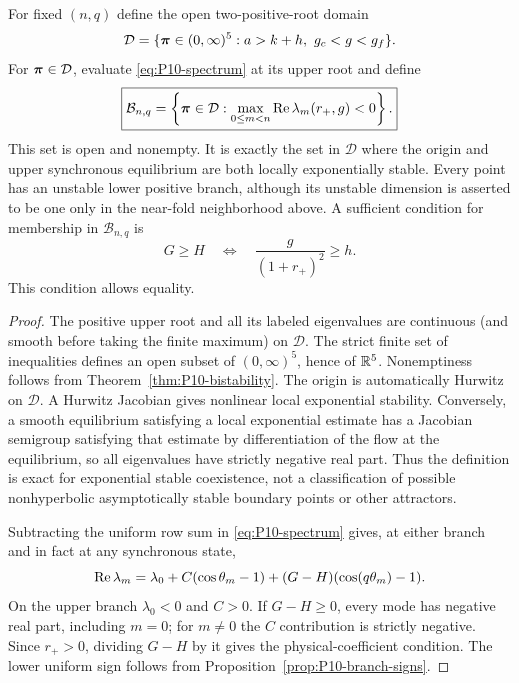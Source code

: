 \begin{proposition}
\label{prop:P10-bistability-set}
For fixed $(n,q)$ define the open two-positive-root domain
\[
 \mathcal D=\{\param\in(0,\infty)^5:a>k+h,\ g_c<g<g_f\}.
\]
For $\boldsymbol{\pi}\in\mathcal D$, evaluate \eqref{eq:P10-spectrum} at its
upper root and define
\begin{equation}
 \boxed{\mathcal B_{n,q}=
 \left\{\boldsymbol{\pi}\in\mathcal D:
 \max_{0\le m<n}\operatorname{Re}\lambda_m(r_+,g)<0\right\}.}
 \label{eq:P10-B}
\end{equation}
This set is open and nonempty. It is exactly the set in $\mathcal D$
where the origin and upper synchronous equilibrium are both locally
exponentially stable. Every point has an unstable lower positive
branch, although its unstable dimension is asserted to be one only
in the near-fold neighborhood above. A sufficient condition for
membership in $\mathcal B_{n,q}$ is
\begin{equation}
 \boxed{G\ge H\quad\Longleftrightarrow\quad
 \frac{g}{(1+r_+)^2}\ge h.}
 \label{eq:P10-sufficient}
\end{equation}
This condition allows equality.
\end{proposition}
\begin{proof}
The positive upper root and all its labeled eigenvalues are continuous
(and smooth before taking the finite maximum) on $\mathcal D$.
The strict finite set of inequalities defines an open subset of
$(0,\infty)^5$, hence of $\mathbb{R}^5$. Nonemptiness follows from
Theorem~\ref{thm:P10-bistability}. The origin is automatically Hurwitz
on $\mathcal D$. A Hurwitz Jacobian gives nonlinear local exponential
stability. Conversely, a smooth equilibrium satisfying a local
exponential estimate has a Jacobian semigroup satisfying that estimate
by differentiation of the flow at the equilibrium, so all eigenvalues
have strictly negative real part. Thus the definition is exact for
exponential stable coexistence, not a classification of possible
nonhyperbolic asymptotically stable boundary points or other attractors.

Subtracting the uniform row sum in \eqref{eq:P10-spectrum} gives,
at either branch and in fact at any synchronous state,
\begin{equation}
 \operatorname{Re}\lambda_m=\lambda_0+C(\cos\theta_m-1)
                         +(G-H)(\cos(q\theta_m)-1).
 \label{eq:P10-difference}
\end{equation}
On the upper branch $\lambda_0<0$ and $C>0$. If $G-H\ge0$,
every mode has negative real part, including $m=0$; for $m\ne0$
the $C$ contribution is strictly negative. Since $r_+>0$, dividing
$G-H$ by it gives the physical-coefficient condition. The lower
uniform sign follows from Proposition~\ref{prop:P10-branch-signs}.
\end{proof}

